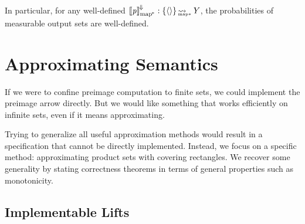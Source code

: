 \documentclass[preprint]{sigplanconf}
\newcommand{\arrow}{\rightsquigarrow}
\newcommand{\conv}{^{\mspace{-2mu}\Downarrow\mspace{-2mu}}}
\newcommand{\meaningofconv}[1]{\left\llbracket{#1}\right\rrbracket\conv}
\newcommand{\pmap}{_\mathrm{map^{\mspace{-2mu}*}}}
\DeclareMathOperator{\pmapto}{\arrow_{\mspace{-22mu}_{\mathrm{map*}}}}
\begin{document}
In particular, for any well-defined $\meaningofconv{\mathit{p}}\pmap : \set{\pair{}} \pmapto Y$, the probabilities of measurable output sets are well-defined.


\section{Approximating Semantics}
\label{sec:approximating-semantics}

If we were to confine preimage computation to finite sets, we could implement the preimage arrow directly.
But we would like something that works efficiently on infinite sets, even if it means approximating.

Trying to generalize all useful approximation methods would result in a specification that cannot be directly implemented.
Instead, we focus on a specific method: approximating product sets with covering rectangles.
We recover some generality by stating correctness theorems in terms of general properties such as monotonicity.

\subsection{Implementable Lifts}
\end{document}
